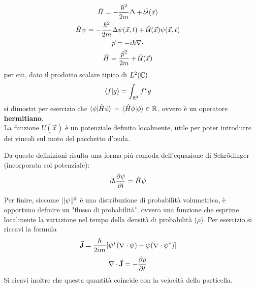 \begin{gather*}
	\hat{H} = - \frac{\hslash^2}{2m} \Delta + \hat{\mathcal{U}}(\vec x)\\
	\hat{H}\psi = - \frac{\hslash^2}{2m} \Delta \psi(\vec x, t) + \hat{\mathcal{U}}(\vec x) \psi(\vec{x}, t)\\
	\vec p = - i \hslash \nabla\cdot \\
	\hat{H} = \frac{\hat p ^2}{2m} + \hat{\mathcal{U}}(\vec x)
\end{gather*}
per cui, dato il prodotto scalare tipico di $L^2(\mathbb{C})$
\[
	\langle f | g \rangle = \int_{\mathbb{R}^3} f^\star g
\]
si dimostri per esercizio che $\langle \phi | \hat{H}\phi \rangle$ = $\langle \hat{H}\phi | \phi \rangle \in \mathbb{R}$, ovvero è un operatore \textbf{hermitiano}.\\
La funzione $U(\vec x)$ è un potenziale definito localmente, utile per poter introdurre dei vincoli sul moto del pacchetto d'onda.

Da queste definizioni risulta una forma più comoda dell'equazione di Schrödinger (incorporata col potenziale):
\[
	i\hslash\frac{\partial \psi}{\partial t} = \hat{H} \psi
\]

Per finire, siccome $||\psi||^2$ è una distribuzione di probabilità volumetrica, è opportuno definire un "flusso di probabilità", ovvero una funzione che esprime localmente la variazione nel tempo della densità di probabilità ($\rho$). Per esercizio si riccavi la formula
\[
	\vec{\textbf{J}} = \frac{\hslash}{2im}[\psi^*(\nabla\cdot\psi) - \psi(\nabla\cdot\psi^*)] \]\[
	\nabla\cdot \vec{\textbf{J}} = -\frac{\partial \rho}{\partial t}
\]
Si ricavi inoltre che questa quantità coincide con la velocità della particella.